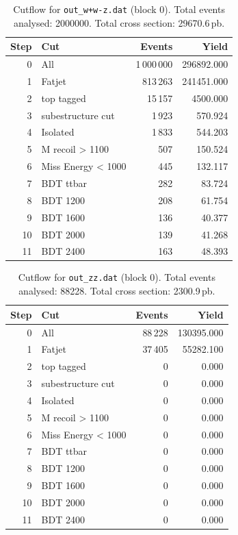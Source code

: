 \documentclass{article}
\begin{document}
\begin{table}[H]
\centering
\begin{tabular}{r l r r}
\toprule
Step & Cut & Events & Yield \\
\midrule
0 & All & 1\,000\,000 & 296892.000 \\
1 & Fatjet & 813\,263 & 241451.000 \\
2 & top tagged & 15\,157 & 4500.000 \\
3 & subestructure cut & 1\,923 & 570.924 \\
4 & Isolated & 1\,833 & 544.203 \\
5 & M recoil > 1100 & 507 & 150.524 \\
6 & Miss Energy < 1000 & 445 & 132.117 \\
7 & BDT ttbar & 282 & 83.724 \\
8 & BDT 1200 & 208 & 61.754 \\
9 & BDT 1600 & 136 & 40.377 \\
10 & BDT 2000 & 139 & 41.268 \\
11 & BDT 2400 & 163 & 48.393 \\
\bottomrule
\end{tabular}
\caption{Cutflow for \texttt{out\_w+w-z.dat} (block 0). Total events analysed: 2000000. Total cross section: 29670.6\,pb.}
\label{tab:cutflow-out-w-w-z-dat}
\end{table}

\begin{table}[H]
\centering
\begin{tabular}{r l r r}
\toprule
Step & Cut & Events & Yield \\
\midrule
0 & All & 88\,228 & 130395.000 \\
1 & Fatjet & 37\,405 & 55282.100 \\
2 & top tagged & 0 & 0.000 \\
3 & subestructure cut & 0 & 0.000 \\
4 & Isolated & 0 & 0.000 \\
5 & M recoil > 1100 & 0 & 0.000 \\
6 & Miss Energy < 1000 & 0 & 0.000 \\
7 & BDT ttbar & 0 & 0.000 \\
8 & BDT 1200 & 0 & 0.000 \\
9 & BDT 1600 & 0 & 0.000 \\
10 & BDT 2000 & 0 & 0.000 \\
11 & BDT 2400 & 0 & 0.000 \\
\bottomrule
\end{tabular}
\caption{Cutflow for \texttt{out\_zz.dat} (block 0). Total events analysed: 88228. Total cross section: 2300.9\,pb.}
\label{tab:cutflow-out-zz-dat}
\end{table}
\end{document}
